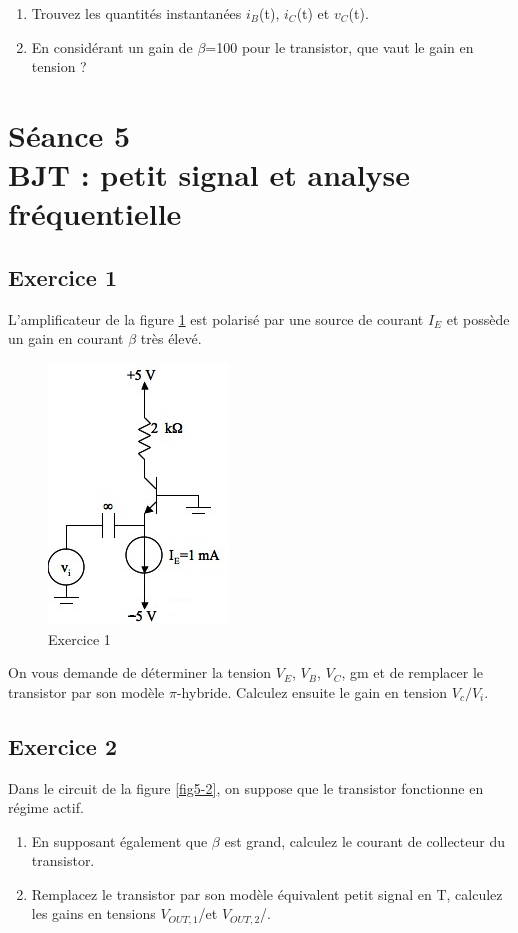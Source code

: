 \documentclass[paper=a4, fontsize=11pt]{article} %
\numberwithin{equation}{section} %
\numberwithin{figure}{section} %
\numberwithin{table}{section} %
\begin{document}
\begin{enumerate}
	 \item  Trouvez les quantités instantanées $i_B$(t), $i_C$(t) et $v_C$(t).
	 \item En considérant un gain de $\beta$=100 pour le transistor, que vaut le gain en tension ?
\end{enumerate}











\newpage
\setcounter{figure}{0}
\setcounter{section}{5}
\section{Séance 5\\ BJT : petit signal et analyse fréquentielle}

\subsection*{Exercice 1}
L'amplificateur de la figure \ref{fig5-1} est polarisé par une source de courant $I_E$ et possède un gain en courant $\beta$ très élevé.

\begin{figure}[!htbp]
   \centering
   \includegraphics[]{figure/fig5-1.png}
   \caption{Exercice 1}
   \label{fig5-1}
\end{figure}

On vous demande de déterminer la tension $V_E$, $V_B$, $V_C$, gm et de remplacer le transistor par son modèle $\pi$-hybride. Calculez ensuite le gain en tension $V_c/V_i$.

\subsection*{Exercice 2}
Dans le circuit de la figure \ref{fig5-2}, on suppose que le transistor fonctionne en régime actif.
\begin{enumerate}
\item En supposant également que $\beta$ est grand, calculez le courant de collecteur du transistor.
\item Remplacez le transistor par son modèle équivalent petit signal en T, calculez les gains en tensions $V_{OUT,1}$/\vin et $V_{OUT,2}$/\vin.
\end{enumerate}
\end{document}
